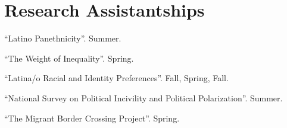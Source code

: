\section*{Research Assistantships}

\begin{comment}
\years{2020-2021}``Non-State Armed Actors Governance Delivery in Colombia''. Fall, Spring. \\ 
\desc{Principal Investigator: Dr. Javier Osorio}
\end{comment}

``Latino Panethnicity''. Summer. \\ 


``The Weight of Inequality''. Spring. \\


``Latina/o Racial and Identity Preferences''. Fall, Spring, Fall. \\ 


\begin{comment} 
\years{2019}``Putting the Geo back in Geopolitics: A Cross-National Quantitative Analysis''. Spring. 
\desc{Principal Investigator: Prof. Albert Bergesen} 
\end{comment}


``National Survey on Political Incivility and Political Polarization''. Summer. \\


``The Migrant Border Crossing Project''. Spring. \\
